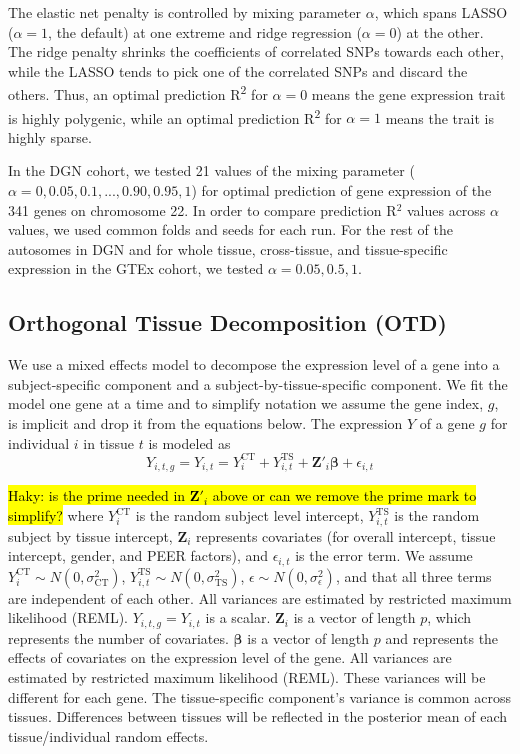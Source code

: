 \documentclass[10pt,letterpaper]{article}
\begin{document}
The elastic net penalty is controlled by mixing parameter \(\alpha\),
which spans LASSO (\(\alpha=1\), the default) \cite{Tibshirani_1996} at one extreme
and ridge regression (\(\alpha=0\)) \cite{Hoerl_1970} at the other. The ridge
penalty shrinks the coefficients of correlated SNPs towards each other,
while the LASSO tends to pick one of the correlated SNPs and discard the
others. Thus, an optimal prediction R\textsuperscript{2} for
\(\alpha=0\) means the gene expression trait is highly polygenic, while
an optimal prediction R\textsuperscript{2} for \(\alpha=1\) means the
trait is highly sparse. 

In the DGN cohort, we tested 21 values of the mixing parameter
(\(\alpha=0, 0.05, 0.1, ..., 0.90, 0.95, 1\)) for optimal prediction of
gene expression of the 341 genes on chromosome 22. In order to compare prediction R$^2$ values across $\alpha$ values, we used common folds and seeds for each run. For the rest of the
autosomes in DGN and for whole tissue, cross-tissue, and tissue-specific
expression in the GTEx cohort, we tested \(\alpha=0.05, 0.5, 1\).


\subsection*{Orthogonal Tissue Decomposition (OTD)}\label{orthogonal-tissue-decomposition}

We use a mixed effects model to decompose the expression level of a gene into a subject-specific component and a subject-by-tissue-specific component.  We fit the model one gene at a time and to simplify notation we assume the gene index, $g$, is implicit and drop it from the equations below. The expression $Y$ of a gene $g$ for individual $i$ in tissue $t$ is modeled as
%
\[Y_{i,t,g} = Y_{i,t} =  Y_{i}^{\text{CT}}   + Y_{i,t}^{\text{TS}} + \mathbf{Z}'_i \boldsymbol{\beta} + \epsilon_{i,t}  \] 
%

\hl{Haky: is the prime needed in $\mathbf{Z}'_i$ above or can we remove the prime mark to simplify?}
%
where $Y_{i}^{\text{CT}}$ is the random subject level intercept,  $Y_{i,t}^{\text{TS}} $ is the random subject by tissue intercept, $\mathbf{Z}_i $ represents covariates (for overall intercept, tissue intercept, gender, and PEER factors), and $\epsilon_{i,t}$ is the error term. We assume $Y_{i}^{\text{CT}} \sim N(0,\sigma_{\text{CT}}^2)$, $Y_{i,t}^{\text{TS}} \sim N(0,\sigma_{\text{TS}}^2)$, $\epsilon \sim N(0,\sigma^2_{\epsilon})$, and that all three terms are independent of each other. All variances are estimated by restricted maximum likelihood (REML). $Y_{i,t,g}=Y_{i,t}$ is a scalar. $\mathbf{Z}_i$ is a vector of length $p$, which represents the number of covariates. $\boldsymbol{\beta}$ is a vector of length $p$ and represents the effects of covariates on the expression level of the gene. All variances are estimated by restricted maximum likelihood (REML). These variances will be different for each gene. The tissue-specific component's variance is common across tissues. Differences between tissues will be reflected in the posterior mean of each tissue/individual random effects.
\end{document}
